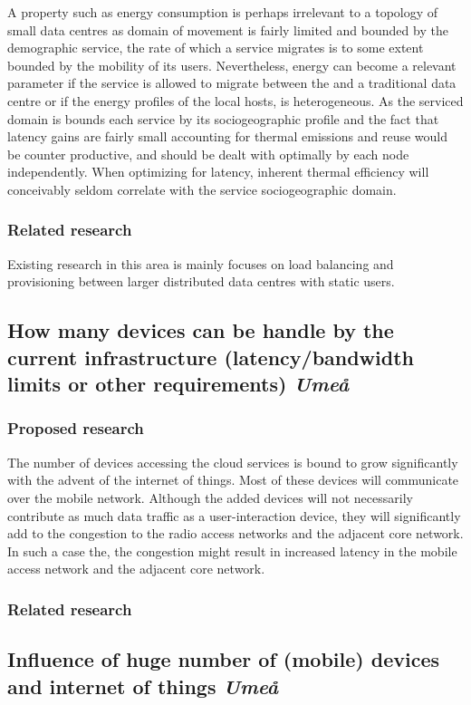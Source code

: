 A property such as energy consumption is perhaps irrelevant to a topology of small data centres as domain of movement is fairly limited and bounded by the demographic service, the rate of which a service migrates is to some extent bounded by the mobility of its users. Nevertheless, energy can become a relevant parameter if the service is allowed to migrate between the \xcloud and a traditional data centre or if the energy profiles of the local \xcloud hosts, is heterogeneous. As the serviced domain is bounds each service by its sociogeographic profile and the fact that latency gains are fairly small accounting for thermal emissions and reuse would be counter productive, and should be dealt with optimally by each node independently. When optimizing for latency, inherent thermal efficiency will conceivably seldom correlate with the service sociogeographic domain. 

\subsubsection{Related research}
Existing research in this area is mainly focuses on load balancing and provisioning between larger distributed data centres with static users.


\subsection{How many devices can be handle by the current infrastructure (latency/bandwidth limits or other requirements) \emph{Umeå} }
\subsubsection{Proposed research}
The number of devices accessing the cloud services is bound to grow significantly with the advent of the internet of things. Most of these devices will communicate over the mobile network. Although the added devices will not necessarily contribute as much data traffic as a user-interaction device, they will significantly add to the congestion to the radio access networks and the adjacent core network. In such a case the, the congestion might result in increased latency in the mobile access network and the adjacent core network.
\subsubsection{Related research}


\subsection{Influence of huge number of (mobile) devices and internet of things \emph{Umeå} }
